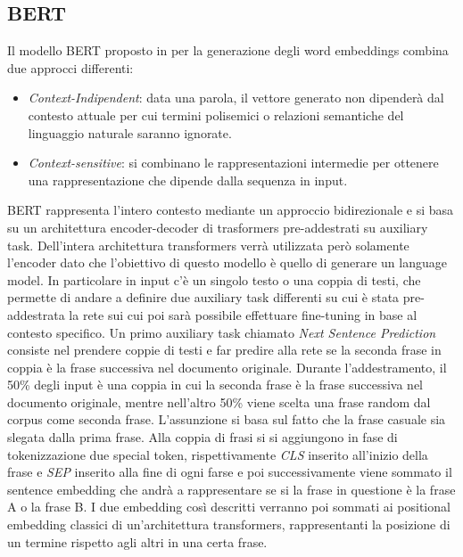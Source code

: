 \subsection{BERT}
Il modello BERT proposto in \cite{devlin2019bert} per la generazione degli word embeddings combina due approcci differenti: 
\begin{itemize}
    \item \textit{Context-Indipendent}: data una parola, il vettore generato non dipenderà dal contesto attuale per cui termini polisemici o relazioni semantiche del linguaggio naturale saranno ignorate.
    \item \textit{Context-sensitive}: si combinano le rappresentazioni intermedie per ottenere una rappresentazione che dipende dalla sequenza in input.
\end{itemize}
BERT rappresenta l'intero contesto mediante un approccio bidirezionale e si basa su un architettura encoder-decoder di trasformers pre-addestrati su auxiliary task. Dell'intera architettura transformers verrà utilizzata però solamente l'encoder dato che l'obiettivo di questo modello è quello di generare un language model. 
In particolare in input c'è un singolo testo o una coppia di testi, che permette di andare a definire due auxiliary task differenti su cui è stata pre-addestrata la rete sui cui poi sarà possibile effettuare fine-tuning in base al contesto specifico. \newline
Un primo auxiliary task chiamato \textit{Next Sentence Prediction} consiste nel prendere coppie di testi e far predire alla rete se la seconda frase in coppia  è la frase successiva nel documento originale. Durante l'addestramento, il 50\% degli input è una coppia in cui la seconda frase è la frase successiva nel documento originale, mentre nell'altro 50\% viene scelta una frase random dal corpus come seconda frase. L'assunzione si basa sul fatto che la frase casuale sia slegata dalla prima frase.
\newline
Alla coppia di frasi si si aggiungono in fase di tokenizzazione due special token, rispettivamente \textit{CLS} inserito all'inizio della frase e \textit{SEP} inserito alla fine di ogni farse e poi successivamente viene sommato il sentence embedding che andrà a rappresentare se si la frase in questione è la frase A o la frase B. I due embedding così descritti verranno poi sommati ai positional embedding classici di un'architettura transformers, rappresentanti la posizione di un termine rispetto agli altri in una certa frase.\newline

